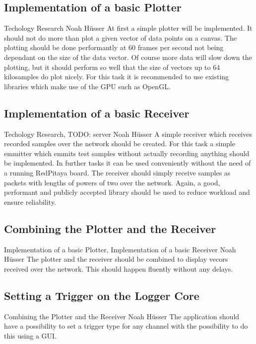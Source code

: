 \documentclass[a4paper,oneside]{alpenspecs/alpenspecs}
\begin{document}
\subsection{Implementation of a basic Plotter}
\label{subsec:frontend:}
\wpac
     {}
     {}
     {}
     {Techology Research}
     {}
     {Noah Hüsser}
     {%
         At first a simple plotter will be implemented. It should not do more than plot a given vector of data points on a canvas.
         The plotting should be done performantly at 60 frames per second not being dependant on the size of the data vector.
         Of course more data will slow down the plotting, but it should perform so well that the size of vectors up to 64 kilosamples do plot nicely.
         For this task it is recommended to use existing libraries which make use of the GPU such as OpenGL.
     }

\subsection{Implementation of a basic Receiver}
\label{subsec:frontend:}
\wpac
     {}
     {}
     {}
     {Techology Research, TODO: server}
     {}
     {Noah Hüsser}
     {%
         A simple receiver which receives recorded samples over the network should be created.
         For this task a simple emmitter which emmits test samples without actually recording anything should be implemented.
         In further tasks it can be used conveniently without the need of a running RedPitaya board.
         The receiver should simply receive samples as packets with lengths of powers of two over the network.
         Again, a good, performant and publicly accepted library should be used to reduce workload and ensure reliability.
     }

\subsection{Combining the Plotter and the Receiver}
\label{subsec:frontend:}
\wpac
     {}
     {}
     {}
     {Implementation of a basic Plotter, Implementation of a basic Receiver}
     {}
     {Noah Hüsser}
     {%
         The plotter and the receiver should be combined to display vecors received over the network.
         This should happen fluently without any delays.
     }

\subsection{Setting a Trigger on the Logger Core}
\label{subsec:frontend:}
\wpac
     {}
     {}
     {}
     {Combining the Plotter and the Receiver}
     {}
     {Noah Hüsser}
     {%
         The application should have a possibility to set a trigger type for any channel with the possibility to do this using a GUI.
     }
\end{document}
